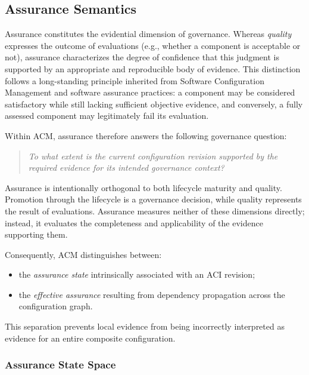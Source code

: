 \documentclass[10pt]{article}
\begin{document}
\subsection{Assurance Semantics}
\label{subsec:assurance_semantics}

Assurance constitutes the evidential dimension of governance. Whereas
\emph{quality} expresses the outcome of evaluations (e.g., whether a component
is acceptable or not), assurance characterizes the degree of confidence that
this judgment is supported by an appropriate and reproducible body of evidence.
This distinction follows a long-standing principle inherited from Software
Configuration Management and software assurance practices: a component may be
considered satisfactory while still lacking sufficient objective evidence, and
conversely, a fully assessed component may legitimately fail its evaluation.

Within ACM, assurance therefore answers the following governance question:

\begin{quote}
\emph{To what extent is the current configuration revision supported by the
required evidence for its intended governance context?}
\end{quote}

Assurance is intentionally orthogonal to both lifecycle maturity and quality.
Promotion through the lifecycle is a governance decision, while quality
represents the result of evaluations. Assurance measures neither of these
dimensions directly; instead, it evaluates the completeness and applicability
of the evidence supporting them.

Consequently, ACM distinguishes between:

\begin{itemize}
    \item the \emph{assurance state} intrinsically associated with an ACI
    revision;
    \item the \emph{effective assurance} resulting from dependency propagation
    across the configuration graph.
\end{itemize}

This separation prevents local evidence from being incorrectly interpreted as
evidence for an entire composite configuration.

\subsubsection{Assurance State Space}
\end{document}
